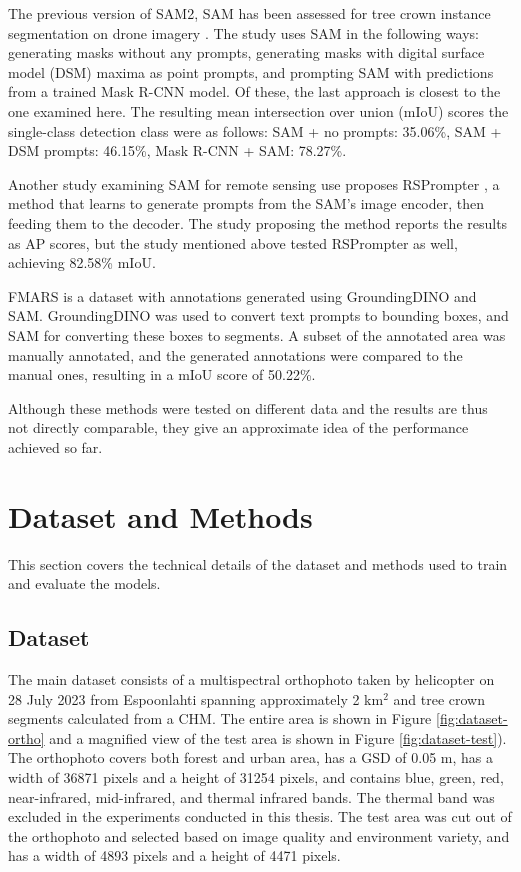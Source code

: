 \documentclass[english, 12pt, a4paper, sci, utf8, a-2b, online]{aaltothesis}
\begin{document}
The previous version of SAM2, SAM has been assessed for tree crown instance segmentation on drone imagery \cite{sam-treecrown}. The study uses SAM in the following ways: generating masks without any prompts, generating masks with digital surface model (DSM) maxima as point prompts, and prompting SAM with predictions from a trained Mask R-CNN model. Of these, the last approach is closest to the one examined here. The resulting mean intersection over union (mIoU) scores the single-class detection class were as follows: SAM + no prompts: 35.06\%, SAM + DSM prompts: 46.15\%, Mask R-CNN + SAM: 78.27\%.

Another study examining SAM for remote sensing use proposes RSPrompter \cite{rsprompter}, a method that learns to generate prompts from the SAM's image encoder, then feeding them to the decoder. The study proposing the method reports the results as AP scores, but the study mentioned above tested RSPrompter as well, achieving 82.58\% mIoU. \cite{sam-treecrown}

FMARS \cite{fmars} is a dataset with annotations generated using GroundingDINO \cite{groundingdino} and SAM. GroundingDINO was used to convert text prompts to bounding boxes, and SAM for converting these boxes to segments. A subset of the annotated area was manually annotated, and the generated annotations were compared to the manual ones, resulting in a mIoU score of 50.22\%.

Although these methods were tested on different data and the results are thus not directly comparable, they give an approximate idea of the performance achieved so far.

\newpage
\section{Dataset and Methods}

This section covers the technical details of the dataset and methods used to train and evaluate the models.

\subsection{Dataset}

The main dataset consists of a multispectral orthophoto taken by helicopter on 28 July 2023 from Espoonlahti spanning approximately 2 km$^2$ and tree crown segments calculated from a CHM. The entire area is shown in Figure \ref{fig:dataset-ortho} and a magnified view of the test area is shown in Figure \ref{fig:dataset-test}). The orthophoto covers both forest and urban area, has a GSD of 0.05 m, has a width of 36871 pixels and a height of 31254 pixels, and contains blue, green, red, near-infrared, mid-infrared, and thermal infrared bands. The thermal band was excluded in the experiments conducted in this thesis. The test area was cut out of the orthophoto and selected based on image quality and environment variety, and has a width of 4893 pixels and a height of 4471 pixels.
\end{document}

